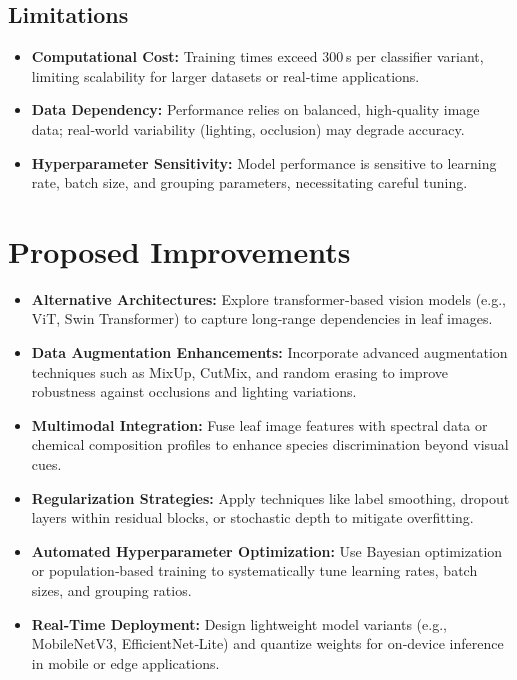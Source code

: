 \documentclass[journal,onecolumn]{IEEEtran}
\begin{document}
\subsection{Limitations}
\begin{itemize}
  \item \textbf{Computational Cost:} Training times exceed 300 s per classifier variant, limiting scalability for larger datasets or real‑time applications.
  \item \textbf{Data Dependency:} Performance relies on balanced, high‑quality image data; real‑world variability (lighting, occlusion) may degrade accuracy.
  \item \textbf{Hyperparameter Sensitivity:} Model performance is sensitive to learning rate, batch size, and grouping parameters, necessitating careful tuning.
\end{itemize}


\section{Proposed Improvements}
\begin{itemize}
  \item \textbf{Alternative Architectures:} Explore transformer‑based vision models (e.g., ViT, Swin Transformer) to capture long‑range dependencies in leaf images.
  \item \textbf{Data Augmentation Enhancements:} Incorporate advanced augmentation techniques such as MixUp, CutMix, and random erasing to improve robustness against occlusions and lighting variations.
  \item \textbf{Multimodal Integration:} Fuse leaf image features with spectral data or chemical composition profiles to enhance species discrimination beyond visual cues.
  \item \textbf{Regularization Strategies:} Apply techniques like label smoothing, dropout layers within residual blocks, or stochastic depth to mitigate overfitting.
  \item \textbf{Automated Hyperparameter Optimization:} Use Bayesian optimization or population‑based training to systematically tune learning rates, batch sizes, and grouping ratios.
  \item \textbf{Real‑Time Deployment:} Design lightweight model variants (e.g., MobileNetV3, EfficientNet‑Lite) and quantize weights for on‑device inference in mobile or edge applications.
\end{itemize}
\end{document}
